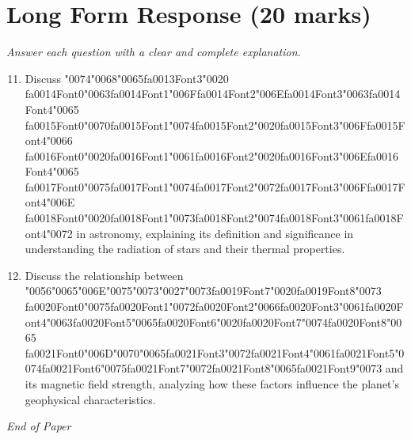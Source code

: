 \documentclass[12pt]{article}
\begin{document}
\section*{Long Form Response (20 marks)}
\textit{Answer each question with a clear and complete explanation.}
\begin{enumerate}[label=\arabic*.]
\setcounter{enumi}{10}
\item Discuss {\char"0074}{\char"0068}{\char"0065}{\csname fa0013Font3\endcsname\char"0020} {\csname fa0014Font0\endcsname\char"0063}{\csname fa0014Font1\endcsname\char"006F}{\csname fa0014Font2\endcsname\char"006E}{\csname fa0014Font3\endcsname\char"0063}{\csname fa0014Font4\endcsname\char"0065} {\csname fa0015Font0\endcsname\char"0070}{\csname fa0015Font1\endcsname\char"0074}{\csname fa0015Font2\endcsname\char"0020}{\csname fa0015Font3\endcsname\char"006F}{\csname fa0015Font4\endcsname\char"0066} {\csname fa0016Font0\endcsname\char"0020}{\csname fa0016Font1\endcsname\char"0061}{\csname fa0016Font2\endcsname\char"0020}{\csname fa0016Font3\endcsname\char"006E}{\csname fa0016Font4\endcsname\char"0065} {\csname fa0017Font0\endcsname\char"0075}{\csname fa0017Font1\endcsname\char"0074}{\csname fa0017Font2\endcsname\char"0072}{\csname fa0017Font3\endcsname\char"006F}{\csname fa0017Font4\endcsname\char"006E} {\csname fa0018Font0\endcsname\char"0020}{\csname fa0018Font1\endcsname\char"0073}{\csname fa0018Font2\endcsname\char"0074}{\csname fa0018Font3\endcsname\char"0061}{\csname fa0018Font4\endcsname\char"0072} in astronomy, explaining its definition and
significance in understanding the radiation of stars and their thermal properties.
\item Discuss the relationship between {\char"0056}{\char"0065}{\char"006E}{\char"0075}{\char"0073}{\char"0027}{\char"0073}{\csname fa0019Font7\endcsname\char"0020}{\csname fa0019Font8\endcsname\char"0073} {\csname fa0020Font0\endcsname\char"0075}{\csname fa0020Font1\endcsname\char"0072}{\csname fa0020Font2\endcsname\char"0066}{\csname fa0020Font3\endcsname\char"0061}{\csname fa0020Font4\endcsname\char"0063}{\csname fa0020Font5\endcsname\char"0065}{\csname fa0020Font6\endcsname\char"0020}{\csname fa0020Font7\endcsname\char"0074}{\csname fa0020Font8\endcsname\char"0065} {\csname fa0021Font0\endcsname\char"006D}{\char"0070}{\char"0065}{\csname fa0021Font3\endcsname\char"0072}{\csname fa0021Font4\endcsname\char"0061}{\csname fa0021Font5\endcsname\char"0074}{\csname fa0021Font6\endcsname\char"0075}{\csname fa0021Font7\endcsname\char"0072}{\csname fa0021Font8\endcsname\char"0065}{\csname fa0021Font9\endcsname\char"0073} and its magnetic field strength,
analyzing how these factors influence the planet's geophysical characteristics.
\end{enumerate}

\vfill
\noindent\textit{End of Paper}
\end{document}
